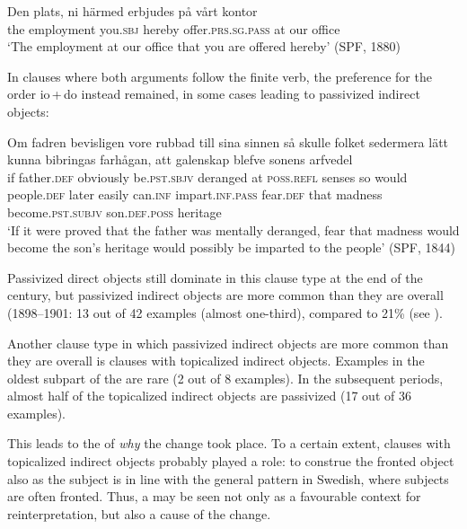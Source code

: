 \documentclass[output=paper]{langscibook}
\begin{document}
\ea%
    \label{ex:falk:24}
\gll Den    plats,        ni        härmed  erbjudes          på  vårt  kontor\\
    the    employment  you.\textsc{sbj}  hereby    offer\textsc{.prs.sg.pass}    at  our  office\\
\glt ‘The employment at our office that you are offered hereby’ (SPF, 1880)
\z


In clauses where both arguments follow the finite verb, the preference for the order io\,+\,do instead remained, in some cases leading to passivized indirect objects:

\ea%
    \label{ex:falk:25}
\gll Om  fadren    bevisligen    vore            rubbad    till    sina      sinnen  så skulle folket      sedermera  lätt      kunna    bibringas    farhågan,  att galenskap blefve              sonens          arfvedel\\
    if    father\textsc{.def}  obviously      be.\textsc{pst.sbjv}    deranged  at    \textsc{poss}.\textsc{refl}  senses  so         would people.\textsc{def}   later        easily    can.\textsc{inf}    impart.\textsc{inf.pass}  fear.\textsc{def}    that         madness   become.\textsc{pst.subjv}  son.\textsc{def.poss}  heritage  \\
\glt ‘If it were proved that the father was mentally deranged, fear that madness would become the son’s heritage would possibly be imparted to the people’ (SPF, 1844)
\z

Passivized direct objects still dominate in this clause type at the end of the century, but passivized indirect objects are more common than they are overall (1898–1901: 13 out of 42 examples (almost one-third), compared to 21\% (see ).


Another clause type in which passivized indirect objects are more common than they are overall is clauses with topicalized indirect objects. Examples in the oldest subpart of the  are rare (2 out of 8 examples). In the subsequent periods, almost half of the topicalized indirect objects are passivized (17 out of 36 examples).



This leads to the  of \textit{why} the change took place. To a certain extent, clauses with topicalized indirect objects probably played a role: to construe the fronted object also as the subject is in line with the general pattern in Swedish, where subjects are often fronted. Thus, a  may be seen not only as a favourable context for reinterpretation, but also a cause of the change.
\end{document}
